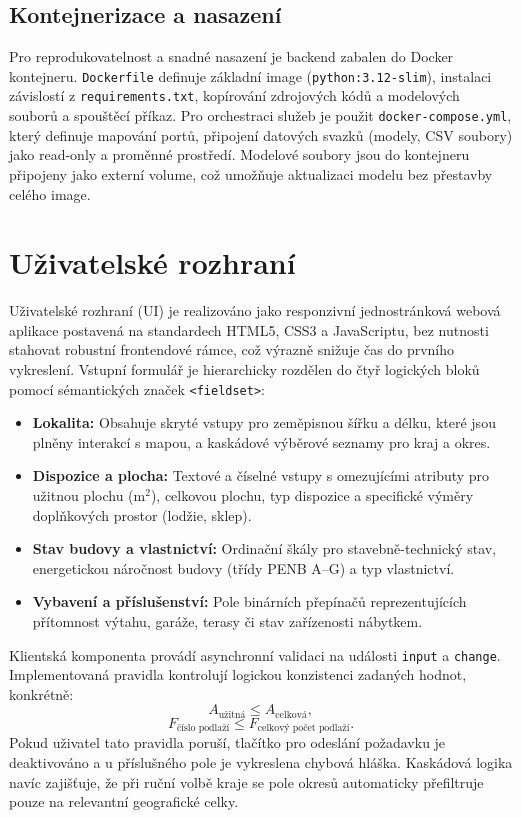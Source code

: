 \subsection*{Kontejnerizace a nasazení}
Pro reprodukovatelnost a snadné nasazení je backend zabalen do Docker kontejneru. \texttt{Dockerfile} definuje základní image (\texttt{python:3.12-slim}), instalaci závislostí z \texttt{requirements.txt}, kopírování zdrojových kódů a modelových souborů a spouštěcí příkaz. Pro orchestraci služeb je použit \texttt{docker-compose.yml}, který definuje mapování portů, připojení datových svazků (modely, CSV soubory) jako read-only a proměnné prostředí. Modelové soubory jsou do kontejneru připojeny jako externí volume, což umožňuje aktualizaci modelu bez přestavby celého image.


\section{Uživatelské rozhraní}
\label{sec:frontend}

Uživatelské rozhraní (UI) je realizováno jako responzivní jednostránková webová aplikace postavená na standardech HTML5, CSS3 a JavaScriptu, bez nutnosti stahovat robustní frontendové rámce, což výrazně snižuje čas do prvního vykreslení. Vstupní formulář je hierarchicky rozdělen do čtyř logických bloků pomocí sémantických značek \texttt{<fieldset>}:
\begin{itemize}
    \item \textbf{Lokalita:} Obsahuje skryté vstupy pro zeměpisnou šířku a délku, které jsou plněny interakcí s mapou, a kaskádové výběrové seznamy pro kraj a okres.
    \item \textbf{Dispozice a plocha:} Textové a číselné vstupy s omezujícími atributy pro užitnou plochu ($\mathrm{m}^2$), celkovou plochu, typ dispozice a specifické výměry doplňkových prostor (lodžie, sklep).
    \item \textbf{Stav budovy a vlastnictví:} Ordinační škály pro stavebně-technický stav, energetickou náročnost budovy (třídy PENB A--G) a typ vlastnictví.
    \item \textbf{Vybavení a příslušenství:} Pole binárních přepínačů reprezentujících přítomnost výtahu, garáže, terasy či stav zařízenosti nábytkem.
\end{itemize}

Klientská komponenta provádí asynchronní validaci na události \texttt{input} a \texttt{change}. Implementovaná pravidla kontrolují logickou konzistenci zadaných hodnot, konkrétně:
\begin{equation}
    A_{\text{užitná}} \le A_{\text{celková}},
\end{equation}
\begin{equation}
    F_{\text{číslo podlaží}} \le F_{\text{celkový počet podlaží}}.
\end{equation}
Pokud uživatel tato pravidla poruší, tlačítko pro odeslání požadavku je deaktivováno a u příslušného pole je vykreslena chybová hláška. Kaskádová logika navíc zajišťuje, že při ruční volbě kraje se pole okresů automaticky přefiltruje pouze na relevantní geografické celky.

